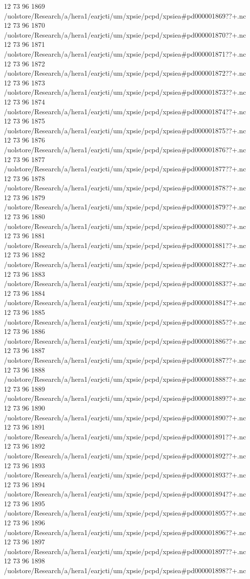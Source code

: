 12 73 96
1869
/uolstore/Research/a/hera1/earjcti/um/xpsie/pcpd/xpsiea#pd000001869??+.nc
12 73 96
1870
/uolstore/Research/a/hera1/earjcti/um/xpsie/pcpd/xpsiea#pd000001870??+.nc
12 73 96
1871
/uolstore/Research/a/hera1/earjcti/um/xpsie/pcpd/xpsiea#pd000001871??+.nc
12 73 96
1872
/uolstore/Research/a/hera1/earjcti/um/xpsie/pcpd/xpsiea#pd000001872??+.nc
12 73 96
1873
/uolstore/Research/a/hera1/earjcti/um/xpsie/pcpd/xpsiea#pd000001873??+.nc
12 73 96
1874
/uolstore/Research/a/hera1/earjcti/um/xpsie/pcpd/xpsiea#pd000001874??+.nc
12 73 96
1875
/uolstore/Research/a/hera1/earjcti/um/xpsie/pcpd/xpsiea#pd000001875??+.nc
12 73 96
1876
/uolstore/Research/a/hera1/earjcti/um/xpsie/pcpd/xpsiea#pd000001876??+.nc
12 73 96
1877
/uolstore/Research/a/hera1/earjcti/um/xpsie/pcpd/xpsiea#pd000001877??+.nc
12 73 96
1878
/uolstore/Research/a/hera1/earjcti/um/xpsie/pcpd/xpsiea#pd000001878??+.nc
12 73 96
1879
/uolstore/Research/a/hera1/earjcti/um/xpsie/pcpd/xpsiea#pd000001879??+.nc
12 73 96
1880
/uolstore/Research/a/hera1/earjcti/um/xpsie/pcpd/xpsiea#pd000001880??+.nc
12 73 96
1881
/uolstore/Research/a/hera1/earjcti/um/xpsie/pcpd/xpsiea#pd000001881??+.nc
12 73 96
1882
/uolstore/Research/a/hera1/earjcti/um/xpsie/pcpd/xpsiea#pd000001882??+.nc
12 73 96
1883
/uolstore/Research/a/hera1/earjcti/um/xpsie/pcpd/xpsiea#pd000001883??+.nc
12 73 96
1884
/uolstore/Research/a/hera1/earjcti/um/xpsie/pcpd/xpsiea#pd000001884??+.nc
12 73 96
1885
/uolstore/Research/a/hera1/earjcti/um/xpsie/pcpd/xpsiea#pd000001885??+.nc
12 73 96
1886
/uolstore/Research/a/hera1/earjcti/um/xpsie/pcpd/xpsiea#pd000001886??+.nc
12 73 96
1887
/uolstore/Research/a/hera1/earjcti/um/xpsie/pcpd/xpsiea#pd000001887??+.nc
12 73 96
1888
/uolstore/Research/a/hera1/earjcti/um/xpsie/pcpd/xpsiea#pd000001888??+.nc
12 73 96
1889
/uolstore/Research/a/hera1/earjcti/um/xpsie/pcpd/xpsiea#pd000001889??+.nc
12 73 96
1890
/uolstore/Research/a/hera1/earjcti/um/xpsie/pcpd/xpsiea#pd000001890??+.nc
12 73 96
1891
/uolstore/Research/a/hera1/earjcti/um/xpsie/pcpd/xpsiea#pd000001891??+.nc
12 73 96
1892
/uolstore/Research/a/hera1/earjcti/um/xpsie/pcpd/xpsiea#pd000001892??+.nc
12 73 96
1893
/uolstore/Research/a/hera1/earjcti/um/xpsie/pcpd/xpsiea#pd000001893??+.nc
12 73 96
1894
/uolstore/Research/a/hera1/earjcti/um/xpsie/pcpd/xpsiea#pd000001894??+.nc
12 73 96
1895
/uolstore/Research/a/hera1/earjcti/um/xpsie/pcpd/xpsiea#pd000001895??+.nc
12 73 96
1896
/uolstore/Research/a/hera1/earjcti/um/xpsie/pcpd/xpsiea#pd000001896??+.nc
12 73 96
1897
/uolstore/Research/a/hera1/earjcti/um/xpsie/pcpd/xpsiea#pd000001897??+.nc
12 73 96
1898
/uolstore/Research/a/hera1/earjcti/um/xpsie/pcpd/xpsiea#pd000001898??+.nc
